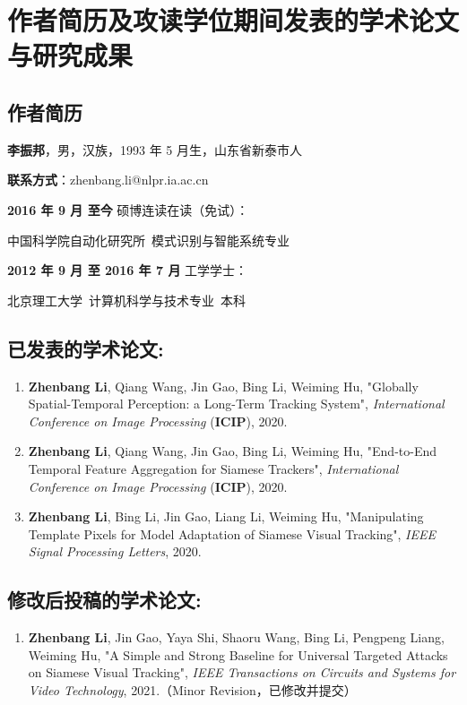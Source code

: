 \chapter{作者简历及攻读学位期间发表的学术论文与研究成果}

\section*{作者简历}

\textbf{李振邦}，男，汉族，1993 年 5 月生，山东省新泰市人

\textbf{联系方式}：zhenbang.li@nlpr.ia.ac.cn

\textbf{2016 年 9 月 至今} 硕博连读在读（免试）：

	中国科学院自动化研究所~模式识别与智能系统专业

\textbf{2012 年 9 月 至 2016 年 7 月} 工学学士：

	北京理工大学~计算机科学与技术专业~本科


\section*{已发表的学术论文:}

{
\setlist[enumerate]{}%
\begin{enumerate}[nosep]
    \item \textbf{Zhenbang Li}, Qiang Wang, Jin Gao,  Bing Li, Weiming Hu, "Globally Spatial-Temporal Perception: a Long-Term Tracking System", \textit{International Conference on Image Processing} (\textbf{ICIP}), 2020.
    \item \textbf{Zhenbang Li}, Qiang Wang, Jin Gao,  Bing Li, Weiming Hu, "End-to-End Temporal Feature Aggregation for Siamese Trackers", \textit{International Conference on Image Processing} (\textbf{ICIP}), 2020.
    \item \textbf{Zhenbang Li}, Bing Li, Jin Gao, Liang Li, Weiming Hu, "Manipulating Template Pixels for Model Adaptation of Siamese Visual Tracking", \textit{IEEE Signal Processing Letters}, 2020.
\end{enumerate}
}

\section*{修改后投稿的学术论文:}
{
\setlist[enumerate]{}%
\begin{enumerate}[nosep]
    \item \textbf{Zhenbang Li}, Jin Gao, Yaya Shi, Shaoru Wang, Bing Li, Pengpeng Liang, Weiming Hu, "A Simple and Strong Baseline for Universal Targeted Attacks on Siamese Visual Tracking", \textit{IEEE Transactions on Circuits and Systems for Video Technology}, 2021.（Minor Revision，已修改并提交）
\end{enumerate}
}

